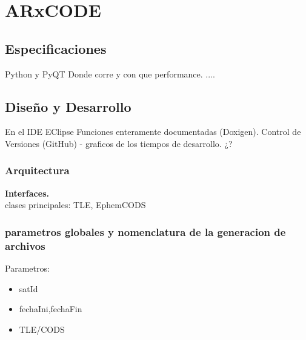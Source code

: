 \chapter{ARxCODE}
\label{chap:arxcode} 

\section{Especificaciones}
Python y PyQT
Donde corre y con que performance.
....


\section{Diseño y Desarrollo}
En el IDE EClipse
Funciones enteramente documentadas (Doxigen).
Control de Versiones (GitHub) - graficos de los tiempos de desarrollo. ¿?


\subsection{Arquitectura}
{\bf{Interfaces.}}\\
clases principales: TLE, EphemCODS
\subsection{parametros globales y nomenclatura de la generacion de archivos}
Parametros:\\
\begin{itemize}
 \item satId
 \item fechaIni,fechaFin
 \item TLE/CODS
\end{itemize}
